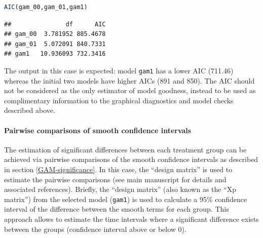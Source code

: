\documentclass[
]{article}
\newcommand{\passthrough}[1]{#1}
\let\oldparagraph\paragraph
\renewcommand{\paragraph}[1]{\oldparagraph{#1}\mbox{}}
\begin{document}
\begin{lstlisting}[language=R]
AIC(gam_00,gam_01,gam1)
\end{lstlisting}

\begin{lstlisting}
##               df      AIC
## gam_00  3.781952 885.4678
## gam_01  5.072091 840.7331
## gam1   10.936093 732.3416
\end{lstlisting}

The output in this case is expected: model \passthrough{\lstinline!gam1!} has a lower AIC (711.46) whereas the initial two models have higher AICs (891 and 850). The AIC should not be considered as the only estimator of model goodness, instead to be used as complimentary information to the graphical diagnostics and model checks described above.

\hypertarget{pairwise-comparisons-of-smooth-confidence-intervals}{%
\paragraph{Pairwise comparisons of smooth confidence intervals}\label{pairwise-comparisons-of-smooth-confidence-intervals}}

The estimation of significant differences between each treatment group can be achieved via pairwise comparisons of the smooth confidence intervals as described in section \ref{GAM-significance}. In this case, the ``design matrix'' is used to estimate the pairwise comparisons (see main manuscript for details and associated references). Briefly, the ``design matrix'' (also known as the ``Xp matrix'') from the selected model (\passthrough{\lstinline!gam1!}) is used to calculate a 95\% confidence interval of the difference between the smooth terms for each group. This approach allows to estimate the time intervals where a significant difference exists between the groups (confidence interval above or below 0).
\end{document}
